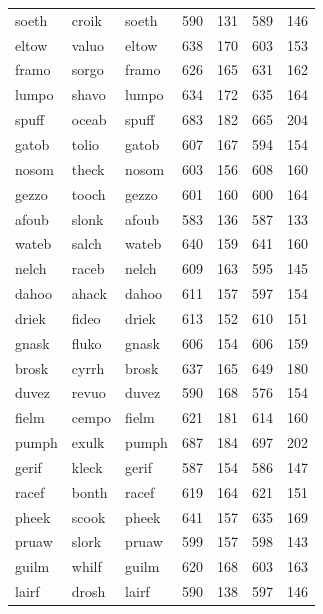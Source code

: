 \documentclass[
]{interact}
\begin{document}
\begin{longtable*}{lllrrrr}
soeth & croik & soeth & 590 & 131 & 589 & 146 \\ 
eltow & valuo & eltow & 638 & 170 & 603 & 153 \\ 
framo & sorgo & framo & 626 & 165 & 631 & 162 \\ 
lumpo & shavo & lumpo & 634 & 172 & 635 & 164 \\ 
spuff & oceab & spuff & 683 & 182 & 665 & 204 \\ 
gatob & tolio & gatob & 607 & 167 & 594 & 154 \\ 
nosom & theck & nosom & 603 & 156 & 608 & 160 \\ 
gezzo & tooch & gezzo & 601 & 160 & 600 & 164 \\ 
afoub & slonk & afoub & 583 & 136 & 587 & 133 \\ 
wateb & salch & wateb & 640 & 159 & 641 & 160 \\ 
nelch & raceb & nelch & 609 & 163 & 595 & 145 \\ 
dahoo & ahack & dahoo & 611 & 157 & 597 & 154 \\ 
driek & fideo & driek & 613 & 152 & 610 & 151 \\ 
gnask & fluko & gnask & 606 & 154 & 606 & 159 \\ 
brosk & cyrrh & brosk & 637 & 165 & 649 & 180 \\ 
duvez & revuo & duvez & 590 & 168 & 576 & 154 \\ 
fielm & cempo & fielm & 621 & 181 & 614 & 160 \\ 
pumph & exulk & pumph & 687 & 184 & 697 & 202 \\ 
gerif & kleck & gerif & 587 & 154 & 586 & 147 \\ 
racef & bonth & racef & 619 & 164 & 621 & 151 \\ 
pheek & scook & pheek & 641 & 157 & 635 & 169 \\ 
pruaw & slork & pruaw & 599 & 157 & 598 & 143 \\ 
guilm & whilf & guilm & 620 & 168 & 603 & 163 \\ 
lairf & drosh & lairf & 590 & 138 & 597 & 146 \\ 
\bottomrule
\end{longtable*}
\end{document}
